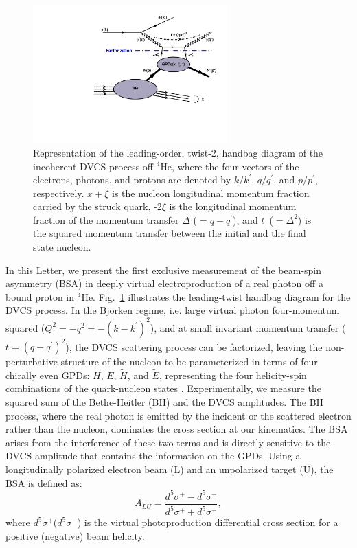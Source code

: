 \documentclass[twocolumn,nofootinbib,prl,superscriptaddress,secnumarabic,amssymb,nobibnotes,aps,floatfix]{revtex4}
\begin{document}
\begin{figure}[tb]
\includegraphics[width=7.5cm]{handbag_incoherent.pdf}
\caption{Representation of the leading-order, twist-2, handbag diagram of the 
   incoherent DVCS process off $^4$He, where the four-vectors of the electrons, 
   photons, and protons are denoted by $k/k^\prime$, $q/q^\prime$, and 
   $p/p^\prime$, respectively. $x+\xi$ is the nucleon longitudinal momentum 
   fraction carried by the struck quark, -2$\xi$ is the longitudinal momentum 
   fraction of the momentum transfer $\Delta$ ($= q - q^\prime$), and 
   $t$~($=\Delta^2$) is the squared momentum transfer between the initial and
   the final state nucleon.}
\label{fig:diags}
\end{figure}

In this Letter, we present the first exclusive measurement of the beam-spin 
asymmetry (BSA) in deeply virtual electroproduction of a real photon off a 
bound proton in $^{4}$He. Fig.~\ref{fig:diags} illustrates the leading-twist 
handbag diagram for the DVCS process. In the Bjorken regime, i.e. large virtual 
photon four-momentum squared ($Q^{2}=-q^2=-(k-k^\prime)^2$), and at small 
invariant momentum transfer ($t=(q-q^\prime)^2$), the DVCS scattering process 
can be factorized, leaving the non-perturbative structure of the nucleon to be 
parameterized in terms of four chirally even GPDs: $H$, $E$, $\widetilde{H}$, 
and $\widetilde{E}$, representing the four helicity-spin combinations of the 
quark-nucleon states \cite{Freund_Collins,Ji_Osborne}. Experimentally, we 
measure the squared sum of the Bethe-Heitler (BH) and the DVCS amplitudes. The 
BH process, where the real photon is emitted by the incident or the scattered 
electron rather than the nucleon, dominates the cross section at our 
kinematics. The BSA arises from the interference of these two terms and is 
directly sensitive to the DVCS amplitude that contains the information on the 
GPDs. Using a longitudinally polarized electron beam (L) and an unpolarized 
target (U), the BSA is defined as:
\begin{equation}
  A_{LU} = \frac{d^{5}\sigma^{+} - d^{5}\sigma^{-} }
                {d^{5}\sigma^{+} + d^{5}\sigma^{-}},
    \label{BSA_equation}
  \end{equation}
where $d^{5}\sigma^{+}$($d^{5}\sigma^{-}$) is the virtual photoproduction 
differential cross section for a positive (negative) beam helicity. 
\end{document}
